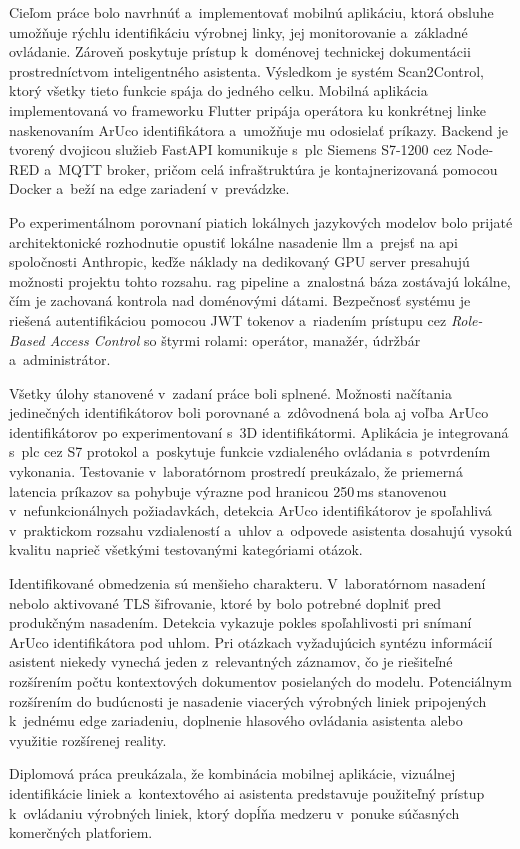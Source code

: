 Cieľom práce bolo navrhnúť a~implementovať mobilnú aplikáciu, ktorá obsluhe
umožňuje rýchlu identifikáciu výrobnej linky, jej
monitorovanie a~základné ovládanie. Zároveň poskytuje prístup k~doménovej
technickej dokumentácii prostredníctvom inteligentného asistenta.
Výsledkom je systém Scan2Control, ktorý všetky tieto funkcie spája do
jedného celku. Mobilná aplikácia implementovaná vo frameworku Flutter pripája operátora
ku konkrétnej linke naskenovaním ArUco identifikátora
a~umožňuje mu odosielať príkazy.
Backend je tvorený dvojicou služieb FastAPI komunikuje s~\acrshort{plc}
Siemens S7-1200 cez Node-RED a~MQTT broker, pričom celá infraštruktúra je
kontajnerizovaná pomocou Docker a~beží na edge zariadení v~prevádzke.

Po experimentálnom porovnaní piatich lokálnych jazykových modelov bolo
prijaté architektonické rozhodnutie opustiť lokálne nasadenie
\acrshort{llm} a~prejsť na \acrshort{api} spoločnosti Anthropic,
keďže náklady na dedikovaný GPU server presahujú možnosti projektu tohto
rozsahu. \acrshort{rag} pipeline a~znalostná báza zostávajú lokálne, čím je
zachovaná kontrola nad doménovými dátami. Bezpečnosť systému je riešená
autentifikáciou pomocou JWT tokenov a~riadením prístupu cez \textit{Role-Based
Access Control} so štyrmi rolami: operátor, manažér, údržbár
a~administrátor.

Všetky úlohy stanovené v~zadaní práce boli splnené. Možnosti načítania
jedinečných identifikátorov boli porovnané a~zdôvodnená bola aj voľba ArUco
identifikátorov po experimentovaní s~3D identifikátormi. Aplikácia je
integrovaná s~\acrshort{plc} cez S7 protokol a~poskytuje funkcie
vzdialeného ovládania s~potvrdením vykonania. Testovanie v~laboratórnom
prostredí preukázalo, že priemerná latencia príkazov sa pohybuje výrazne
pod hranicou 250\,ms stanovenou v~nefunkcionálnych požiadavkách, detekcia ArUco
identifikátorov je spoľahlivá v~praktickom rozsahu vzdialeností a~uhlov
a~odpovede asistenta dosahujú vysokú kvalitu naprieč všetkými testovanými
kategóriami otázok.

Identifikované obmedzenia sú menšieho charakteru. V~laboratórnom nasadení
nebolo aktivované TLS šifrovanie, ktoré by bolo potrebné doplniť pred
produkčným nasadením. Detekcia vykazuje pokles spoľahlivosti pri snímaní ArUco identifikátora pod uhlom. 
Pri otázkach vyžadujúcich syntézu informácií
asistent niekedy vynechá jeden z~relevantných záznamov, čo je riešiteľné
rozšírením počtu kontextových dokumentov posielaných do modelu. Potenciálnym
rozšírením do budúcnosti je nasadenie viacerých výrobných liniek pripojených
k~jednému edge zariadeniu, doplnenie hlasového ovládania asistenta alebo
využitie rozšírenej reality.

Diplomová práca preukázala, že kombinácia mobilnej aplikácie,
vizuálnej identifikácie liniek a~kontextového \acrshort{ai} asistenta
predstavuje použiteľný prístup k~ovládaniu výrobných liniek, ktorý
dopĺňa medzeru v~ponuke súčasných komerčných platforiem.
